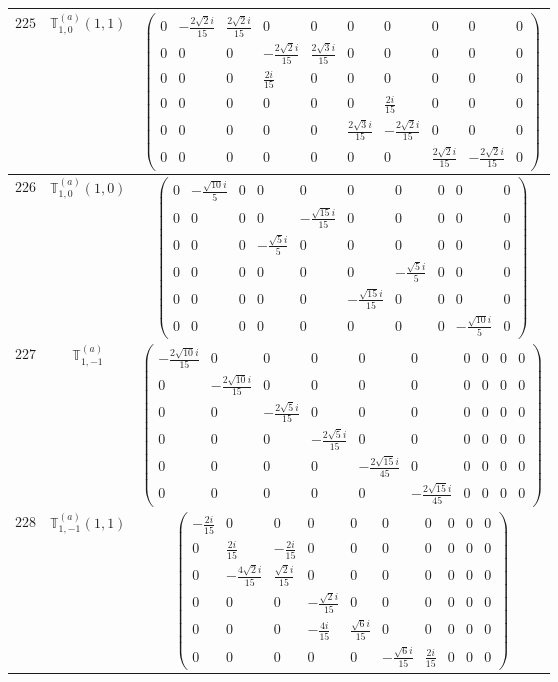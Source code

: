\documentclass[fleqn,8pt,landscape]{jsarticle}
\begin{document}
\begin{center}
\begin{longtable}{ccc}
$ 225 $ & $ \mathbb{T}_{1,0}^{(a)}(1,1) $ & $ \begin{pmatrix} 0 & - \frac{2 \sqrt{2} i}{15} & \frac{2 \sqrt{2} i}{15} & 0 & 0 & 0 & 0 & 0 & 0 & 0 \\ 0 & 0 & 0 & - \frac{2 \sqrt{2} i}{15} & \frac{2 \sqrt{3} i}{15} & 0 & 0 & 0 & 0 & 0 \\ 0 & 0 & 0 & \frac{2 i}{15} & 0 & 0 & 0 & 0 & 0 & 0 \\ 0 & 0 & 0 & 0 & 0 & 0 & \frac{2 i}{15} & 0 & 0 & 0 \\ 0 & 0 & 0 & 0 & 0 & \frac{2 \sqrt{3} i}{15} & - \frac{2 \sqrt{2} i}{15} & 0 & 0 & 0 \\ 0 & 0 & 0 & 0 & 0 & 0 & 0 & \frac{2 \sqrt{2} i}{15} & - \frac{2 \sqrt{2} i}{15} & 0 \end{pmatrix} $ \\ \hline
$ 226 $ & $ \mathbb{T}_{1,0}^{(a)}(1,0) $ & $ \begin{pmatrix} 0 & - \frac{\sqrt{10} i}{5} & 0 & 0 & 0 & 0 & 0 & 0 & 0 & 0 \\ 0 & 0 & 0 & 0 & - \frac{\sqrt{15} i}{15} & 0 & 0 & 0 & 0 & 0 \\ 0 & 0 & 0 & - \frac{\sqrt{5} i}{5} & 0 & 0 & 0 & 0 & 0 & 0 \\ 0 & 0 & 0 & 0 & 0 & 0 & - \frac{\sqrt{5} i}{5} & 0 & 0 & 0 \\ 0 & 0 & 0 & 0 & 0 & - \frac{\sqrt{15} i}{15} & 0 & 0 & 0 & 0 \\ 0 & 0 & 0 & 0 & 0 & 0 & 0 & 0 & - \frac{\sqrt{10} i}{5} & 0 \end{pmatrix} $ \\ \hline
$ 227 $ & $ \mathbb{T}_{1,-1}^{(a)} $ & $ \begin{pmatrix} - \frac{2 \sqrt{10} i}{15} & 0 & 0 & 0 & 0 & 0 & 0 & 0 & 0 & 0 \\ 0 & - \frac{2 \sqrt{10} i}{15} & 0 & 0 & 0 & 0 & 0 & 0 & 0 & 0 \\ 0 & 0 & - \frac{2 \sqrt{5} i}{15} & 0 & 0 & 0 & 0 & 0 & 0 & 0 \\ 0 & 0 & 0 & - \frac{2 \sqrt{5} i}{15} & 0 & 0 & 0 & 0 & 0 & 0 \\ 0 & 0 & 0 & 0 & - \frac{2 \sqrt{15} i}{45} & 0 & 0 & 0 & 0 & 0 \\ 0 & 0 & 0 & 0 & 0 & - \frac{2 \sqrt{15} i}{45} & 0 & 0 & 0 & 0 \end{pmatrix} $ \\ \hline
$ 228 $ & $ \mathbb{T}_{1,-1}^{(a)}(1,1) $ & $ \begin{pmatrix} - \frac{2 i}{15} & 0 & 0 & 0 & 0 & 0 & 0 & 0 & 0 & 0 \\ 0 & \frac{2 i}{15} & - \frac{2 i}{15} & 0 & 0 & 0 & 0 & 0 & 0 & 0 \\ 0 & - \frac{4 \sqrt{2} i}{15} & \frac{\sqrt{2} i}{15} & 0 & 0 & 0 & 0 & 0 & 0 & 0 \\ 0 & 0 & 0 & - \frac{\sqrt{2} i}{15} & 0 & 0 & 0 & 0 & 0 & 0 \\ 0 & 0 & 0 & - \frac{4 i}{15} & \frac{\sqrt{6} i}{15} & 0 & 0 & 0 & 0 & 0 \\ 0 & 0 & 0 & 0 & 0 & - \frac{\sqrt{6} i}{15} & \frac{2 i}{15} & 0 & 0 & 0 \end{pmatrix} $ \\ \hline

\end{longtable}
\end{center}
\end{document}
